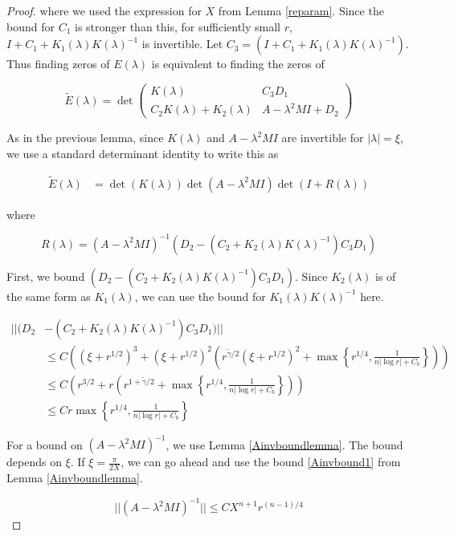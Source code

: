 \documentclass[thesis.tex]{subfiles}
\begin{document}
\begin{lemma}
\begin{proof}
where we used the expression for $X$ from Lemma \ref{reparam}. Since the bound for $C_1$ is stronger than this, for sufficiently small $r$, $I + C_1 + K_1(\lambda)K(\lambda)^{-1}$ is invertible. Let $C_3 = (I + C_1 + K_1(\lambda)K(\lambda)^{-1})$. Thus finding zeros of $E(\lambda)$ is equivalent to finding the zeros of

\begin{equation}
\tilde{E}(\lambda) = \det 
\begin{pmatrix}
K(\lambda) & C_3 D_1 \\
C_2 K(\lambda) + K_2(\lambda) & A - \lambda^2 MI + D_2
\end{pmatrix}
\end{equation}

As in the previous lemma, since $K(\lambda)$ and $A - \lambda^2 M I$ are invertible for $|\lambda| = \xi$, we use a standard determinant identity to write this as

\begin{align*}
\tilde{E}(\lambda)
&= \det(K(\lambda))\det(A - \lambda^2 MI)\det(I + R(\lambda))
\end{align*}

where

\[
R(\lambda) = 
(A - \lambda^2 MI)^{-1}(D_2 - (C_2 + K_2(\lambda)K(\lambda)^{-1})C_3 D_1)
\]

First, we bound $(D_2 - (C_2 + K_2(\lambda)K(\lambda)^{-1})C_3 D_1)$. Since $K_2(\lambda)$ is of the same form as $K_1(\lambda)$, we can use the bound for $K_1(\lambda)K(\lambda)^{-1}$ here.

\begin{align*}
||(D_2 &- (C_2 + K_2(\lambda)K(\lambda)^{-1})C_3 D_1)|| \\
&\leq C \left( (\xi + r^{1/2})^3 + (\xi + r^{1/2})^2 \left( r^{\tilde{\gamma}/2}(\xi + r^{1/2})^2 + \max\left\{ r^{1/4}, \frac{1}{n|\log r| + C_b } \right\} \right) \right) \\
&\leq C \left( r^{3/2} + r \left( r^{1 + \tilde{\gamma}/2} + \max\left\{ r^{1/4}, \frac{1}{n|\log r| + C_b } \right\} \right) \right) \\
&\leq C r \max\left\{ r^{1/4}, \frac{1}{n|\log r| + C_b } \right\} 
\end{align*}

For a bound on $(A - \lambda^2 MI)^{-1}$, we use Lemma \ref{Ainvboundlemma}. The bound depends on $\xi$. If $\xi = \frac{\pi}{2X}$, we can go ahead and use the bound \eqref{Ainvbound1} from Lemma \ref{Ainvboundlemma}.

\[
||(A - \lambda^2 MI)^{-1}|| \leq C X^{n+1} r^{(n-1)/4}
\]


\end{proof}
\end{lemma}
\end{document}
